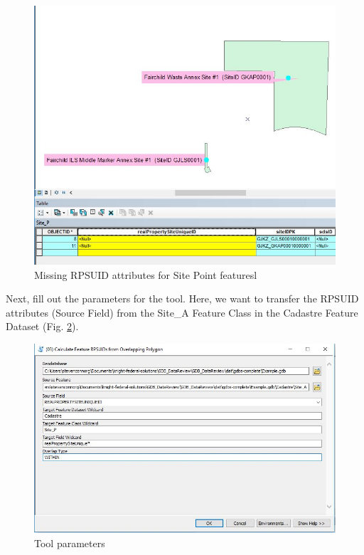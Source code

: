 \documentclass[openany]{book}
\theoremstyle{definition}
\theoremstyle{definition}
\theoremstyle{definition}
\theoremstyle{remark}
\begin{document}
\begin{figure}[H]

{\centering \includegraphics{figures/spatjoinCalc-before} 

}

\caption{Missing RPSUID attributes for Site Point featuresl}\label{fig:sjcbefore}
\end{figure}

\pagebreak
Next, fill out the parameters for the tool. Here, we want to transfer
the RPSUID attributes (Source Field) from the Site\_A Feature Class in
the Cadastre Feature Dataset (Fig. \ref{fig:sjcparams}).

\begin{figure}[H]

{\centering \includegraphics{figures/spatjoinCalc-toolparams} 

}

\caption{Tool parameters}\label{fig:sjcparams}
\end{figure}
\end{document}
